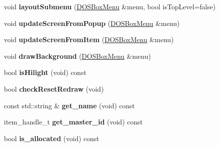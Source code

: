 \begin{DoxyCompactItemize}
\item 
\hypertarget{classDOSBoxMenu_1_1item_a6330cf4dd410ef39dc5602f7447ea426}{void {\bfseries layout\-Submenu} (\hyperlink{classDOSBoxMenu}{D\-O\-S\-Box\-Menu} \&menu, bool is\-Top\-Level=false)}\label{classDOSBoxMenu_1_1item_a6330cf4dd410ef39dc5602f7447ea426}

\item 
\hypertarget{classDOSBoxMenu_1_1item_acc1242431dd41cf9da8409f4be61a943}{void {\bfseries update\-Screen\-From\-Popup} (\hyperlink{classDOSBoxMenu}{D\-O\-S\-Box\-Menu} \&menu)}\label{classDOSBoxMenu_1_1item_acc1242431dd41cf9da8409f4be61a943}

\item 
\hypertarget{classDOSBoxMenu_1_1item_aa311ba352716fbb574348bf3a1d9e991}{void {\bfseries update\-Screen\-From\-Item} (\hyperlink{classDOSBoxMenu}{D\-O\-S\-Box\-Menu} \&menu)}\label{classDOSBoxMenu_1_1item_aa311ba352716fbb574348bf3a1d9e991}

\item 
\hypertarget{classDOSBoxMenu_1_1item_a3d942d105ccbcd133a8297fdb47491cc}{void {\bfseries draw\-Background} (\hyperlink{classDOSBoxMenu}{D\-O\-S\-Box\-Menu} \&menu)}\label{classDOSBoxMenu_1_1item_a3d942d105ccbcd133a8297fdb47491cc}

\item 
\hypertarget{classDOSBoxMenu_1_1item_a11c3aad43382e49cdb7fbab229238e40}{bool {\bfseries is\-Hilight} (void) const }\label{classDOSBoxMenu_1_1item_a11c3aad43382e49cdb7fbab229238e40}

\item 
\hypertarget{classDOSBoxMenu_1_1item_a5cacc470924b408e08ab14c8aa47cad9}{bool {\bfseries check\-Reset\-Redraw} (void)}\label{classDOSBoxMenu_1_1item_a5cacc470924b408e08ab14c8aa47cad9}

\item 
\hypertarget{classDOSBoxMenu_1_1item_a5c68739e7dd55f0d588c67335f12de8e}{const std\-::string \& {\bfseries get\-\_\-name} (void) const }\label{classDOSBoxMenu_1_1item_a5c68739e7dd55f0d588c67335f12de8e}

\item 
\hypertarget{classDOSBoxMenu_1_1item_a37d50a0c9dc86f5598c721baefd48a1d}{item\-\_\-handle\-\_\-t {\bfseries get\-\_\-master\-\_\-id} (void) const }\label{classDOSBoxMenu_1_1item_a37d50a0c9dc86f5598c721baefd48a1d}

\item 
\hypertarget{classDOSBoxMenu_1_1item_ab04213d3b518863d43a4436d75171919}{bool {\bfseries is\-\_\-allocated} (void) const }\label{classDOSBoxMenu_1_1item_ab04213d3b518863d43a4436d75171919}


\end{DoxyCompactItemize}
